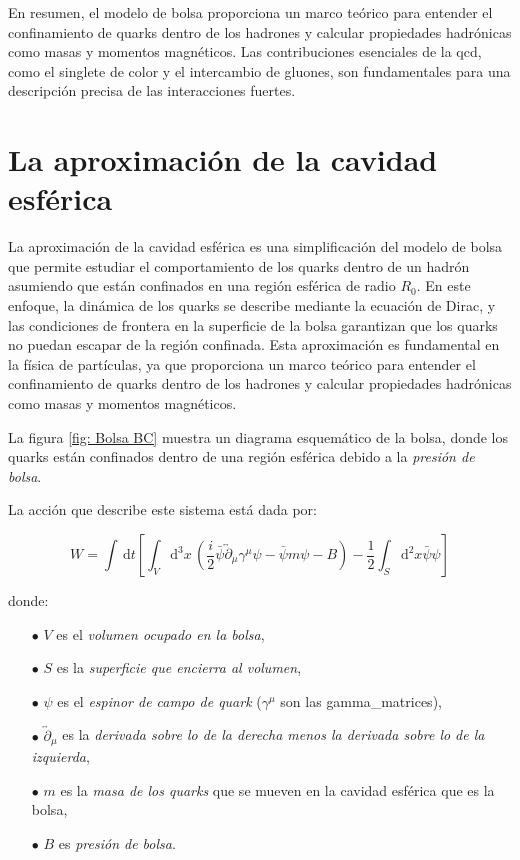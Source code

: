 En resumen, el modelo de bolsa proporciona un marco teórico para entender el confinamiento de quarks dentro de los hadrones y calcular propiedades hadrónicas como masas y momentos magnéticos. Las contribuciones esenciales de la \gls{qcd}, como el singlete de color y el intercambio de gluones, son fundamentales para una descripción precisa de las interacciones fuertes.

\section{La aproximación de la cavidad esférica}

La aproximación de la cavidad esférica es una simplificación del modelo de bolsa que permite estudiar el comportamiento de los quarks dentro de un hadrón asumiendo que están confinados en una región esférica de radio ${R}_{0}$. En este enfoque, la dinámica de los quarks se describe mediante la ecuación de Dirac, y las condiciones de frontera en la superficie de la bolsa garantizan que los quarks no puedan escapar de la región confinada. Esta aproximación es fundamental en la física de partículas, ya que proporciona un marco teórico para entender el confinamiento de quarks dentro de los hadrones y calcular propiedades hadrónicas como masas y momentos magnéticos.

La figura \ref{fig: Bolsa BC} muestra un diagrama esquemático de la bolsa, donde los quarks están confinados dentro de una región esférica debido a la \emph{presión de bolsa}.

La acción que describe este sistema está dada por:

\begin{equation}\label{eq-action}
W = \int \, \mathrm{d}t \left[ \int_{V} \mathrm{d}^{3} x \, \left( \frac{i}{2} \bar{\psi} \overleftrightarrow{\partial}_{\mu} {\gamma}^{\mu} \psi - \bar{\psi} m \psi - B \right) - \frac{1}{2} \int_{S} \mathrm{d}^{2} x \bar{\psi} \psi\right]
\end{equation}

donde:
\begin{itemize}
    \item[$\bullet$] $V$ es el \emph{volumen ocupado en la bolsa},
    \item[$\bullet$] $S$ es la \emph{superficie que encierra al volumen},
    \item[$\bullet$] $\psi$ es el \emph{espinor de campo de quark} (${\gamma}^{\mu}$ son las \gls{gamma_matrices}),
    \item[$\bullet$] $\overleftrightarrow{\partial}_{\mu}$ es la \emph{derivada sobre lo de la derecha menos la derivada sobre lo de la izquierda},
    \item[$\bullet$] $m$ es la \emph{masa de los quarks} que se mueven en la cavidad esférica que es la bolsa,
    \item[$\bullet$] $B$ es \emph{presión de bolsa}.
\end{itemize}


